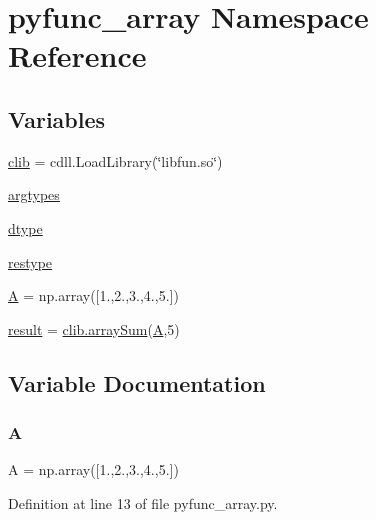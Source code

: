 \hypertarget{namespacepyfunc__array}{}\section{pyfunc\+\_\+array Namespace Reference}
\label{namespacepyfunc__array}
\subsection*{Variables}
\begin{DoxyCompactItemize}
\item 
\mbox{\hyperlink{namespacepyfunc__array_ace4bf3f4d09963496adca6d8952c4d28}{clib}} = cdll.\+Load\+Library(\char`\"{}libfun.\+so\char`\"{})
\item 
\mbox{\hyperlink{namespacepyfunc__array_a4ad1eb96239eecf8f075ae4c92adab5e}{argtypes}}
\item 
\mbox{\hyperlink{namespacepyfunc__array_acfe99d230e216901bd782cc580e4e815}{dtype}}
\item 
\mbox{\hyperlink{namespacepyfunc__array_ab2283b4bbda0fbadaf5d9500e886ecbe}{restype}}
\item 
\mbox{\hyperlink{namespacepyfunc__array_a3b98e2dffc6cb06a89dcb0d5c60a0206}{A}} = np.\+array(\mbox{[}1.,2.,3.,4.,5.\mbox{]})
\item 
\mbox{\hyperlink{namespacepyfunc__array_a937d4dd628a8858b443a399410d2600b}{result}} = \mbox{\hyperlink{cfunc__array_8c_aaf3f2dce9468c7db115ed4cb5b0bd22d}{clib.\+array\+Sum}}(\mbox{\hyperlink{namespacepyfunc__array_a3b98e2dffc6cb06a89dcb0d5c60a0206}{A}},5)
\end{DoxyCompactItemize}


\subsection{Variable Documentation}
\mbox{\label{namespacepyfunc__array_a3b98e2dffc6cb06a89dcb0d5c60a0206}} 
\subsubsection{\texorpdfstring{A}{A}}
{\footnotesize\ttfamily A = np.\+array(\mbox{[}1.,2.,3.,4.,5.\mbox{]})}



Definition at line 13 of file pyfunc\+\_\+array.\+py.

